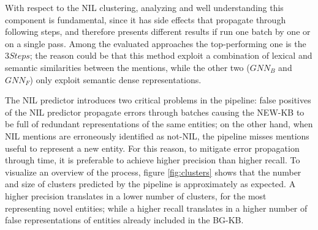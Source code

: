 With respect to the NIL clustering, analyzing and well understanding this component is fundamental, since it has side effects that propagate through following steps, and therefore presents different results if run one batch by one or on a single pass.
Among the evaluated approaches the top-performing one is the $3Steps$; the reason could be that this method exploit a combination of lexical and semantic similarities between the mentions, while the other two ($GNN_B$ and $GNN_F$) only exploit semantic dense representations.

The NIL predictor introduces two critical problems in the pipeline: false positives of the NIL predictor propagate errors through batches causing the NEW-KB to be full of redundant representations of the same entities; on the other hand, when NIL mentions are erroneously identified as not-NIL, the pipeline misses mentions useful to represent a new entity.
For this reason, to mitigate error propagation through time, it is preferable to achieve higher precision than higher recall.
To visualize an overview of the process, figure \ref{fig:clusters} shows that the number and size of clusters predicted by the pipeline is approximately as expected.
A higher precision translates in a lower number of clusters, for the most representing novel entities; while a higher recall translates in a higher number of false representations of entities already included in the BG-KB.

